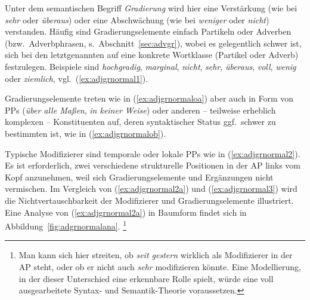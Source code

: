 Unter dem semantischen Begriff \textit{Gradierung} wird hier eine Verstärkung (wie bei \textit{sehr} oder \textit{überaus}) oder eine Abschwächung (wie bei \textit{weniger} oder \textit{nicht}) verstanden.
Häufig sind Gradierungselemente einfach Partikeln oder Adverben (bzw.\ Adverbphrasen, s.\ Abschnitt~\ref{sec:advgr}), wobei es gelegentlich schwer ist, sich bei den letztgenannten auf eine konkrete Wortklasse (Partikel oder Adverb) festzulegen.
Beispiele sind \textit{hochgradig}, \textit{marginal}, \textit{nicht}, \textit{sehr}, \textit{überaus}, \textit{voll}, \textit{wenig} oder \textit{ziemlich}, vgl.\ (\ref{ex:adjgrnormal1}).

\begin{exe}
  \ex\label{ex:adjgrnormal1}
  \begin{xlist}
  \end{xlist}
\end{exe}

Gradierungselemente treten wie in (\ref{ex:adjgrnormaloa}) aber auch in Form von PPs (\zB \textit{über alle Maßen}, \textit{in keiner Weise}) oder anderen -- teilweise erheblich komplexen -- Konstituenten auf, deren syntaktischer Status ggf.\ schwer zu bestimmten ist, wie in (\ref{ex:adjgrnormalob}).

\begin{exe}
  \ex\label{ex:adjgrnormalo}
  \begin{xlist}
  \end{xlist}
\end{exe}

Typische Modifizierer sind tem\-porale oder lokale PPs wie in (\ref{ex:adjgrnormal2}).
Es ist erforderlich, zwei verschiedene strukturelle Positionen in der AP links vom Kopf anzunehmen, weil sich Gradierungselemente und Ergänzungen nicht vermischen.
Im Vergleich von (\ref{ex:adjgrnormal2a}) und (\ref{ex:adjgrnormal3}) wird die Nichtvertauschbarkeit der Modifizierer und Gradierungselemente illustriert.
Eine Analyse von (\ref{ex:adjgrnormal2a}) in Baumform findet sich in Abbildung~\ref{fig:adgrnormalana}.%
\footnote{Man kann sich hier streiten, ob \textit{seit gestern} wirklich als Modifizierer in der AP steht, oder ob er nicht auch \textit{sehr} modifizieren könnte.
Eine Modellierung, in der dieser Unterschied eine erkennbare Rolle spielt, würde eine voll ausgearbeitete Syntax- und Semantik-Theorie voraussetzen.}

